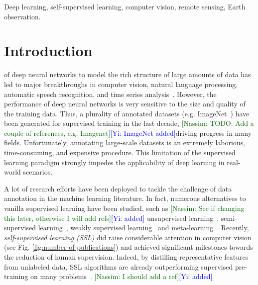 \documentclass[lettersize,journal]{IEEEtran}
\newcommand{\kibitz}[2]{\ifnum\Comments=1\textcolor{#1}{#2}\fi}
\newcommand{\nassim}[1]{\kibitz{darkgreen}      {[Nassim: #1]}}
\newcommand{\yi}[1]  {\kibitz{blue}   {[Yi: #1]}}
\begin{document}
\begin{IEEEkeywords}
Deep learning, self-supervised learning, computer vision, remote sensing, Earth observation.
\end{IEEEkeywords}

\thispagestyle{copyright}

\section{Introduction}

 of deep neural networks to model the rich structure of large amounts of data has led to major breakthroughs in computer vision, natural language processing, automatic speech recognition, and time series analysis~\cite{lecun2015deep}. However, the performance of deep neural networks is very sensitive to the size and quality of the training data. Thus, a plurality of annotated datasets (e.g. ImageNet~\cite{deng2009imagenet}) have been generated for supervised training in the last decade,
\nassim{TODO: Add a couple of references, e.g. Imagenet}\yi{ImageNet added}driving progress in many fields. Unfortunately, annotating large-scale datasets is an extremely laborious, time-consuming, and expensive procedure. This limitation of the supervised learning paradigm strongly impedes the applicability of deep learning in real-world scenarios. 

A lot of research efforts have been deployed to tackle the challenge of data annotation in the machine learning literature. In fact, numerous alternatives to vanilla supervised learning have been studied, such as \nassim{See if changing this later, otherwise I will add refs}\yi{added}
unsupervised learning~\cite{dike2018unsupervised}, semi-supervised learning~\cite{van2020survey}, weakly supervised learning~\cite{zhou2018brief} and meta-learning~\cite{vanschoren2019meta}. Recently, \textit{self-supervised learning (SSL)} did raise considerable attention in computer vision (see Fig. \ref{fig:number-of-publications}) and achieved significant milestones towards the reduction of human supervision. Indeed, by distilling representative features from unlabeled data, SSL algorithms are already outperforming supervised pre-training on many problems~\cite{goyal2021self}.
\nassim{I should add a ref}\yi{added}
\end{document}
